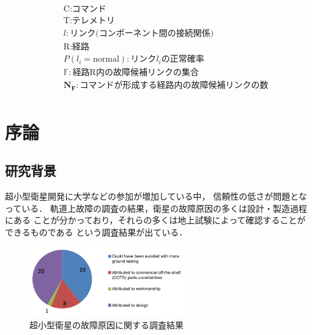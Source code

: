 \documentclass[11pt]{jsarticle}%
\begin{document}
\begin{multicols}{2}
\vspace{-12zh}
\begin{eqnarray*}
   &&\text{C} : \text{コマンド} \\
   &&\text{T} : \text{テレメトリ} \\
   &&l: \text{リンク(コンポーネント間の接続関係)}\\
   &&\text{R}: \text{経路}\\
   &&P(l_{i} = \text{normal}) : \text{リンク}l_i\text{の正常確率}\\
   &&\mathbb{F}: \text{経路R内の故障候補リンクの集合}\\
   &&\mathbf{N_F}: \text{コマンドが形成する経路内の故障候補リンクの数}\\
\end{eqnarray*}
\vspace{-6zh}
  \section{序論}
  \vspace{-1zh}
  \subsection{研究背景}
  \vspace{-1zh}
  超小型衛星開発に大学などの参加が増加している中，
  信頼性の低さが問題となっている\cite{Langer2016}．
  軌道上故障の調査の結果，衛星の故障原因の多くは設計・製造過程にある\cite{Venturini2017}
  ことが分かっており，それらの多くは地上試験によって確認することができるものである
  という調査結果が出ている\cite{SAITO2011}．
  \vspace{-1zh}
  \begin{figure}[H]
    \centering
      \includegraphics[height=3.0cm]{../figure/cause_of_failure.png}
      \caption{超小型衛星の故障原因に関する調査結果\cite{Venturini2017}}
      \label{fig:cause_of_failure}
  \end{figure}
  

\end{multicols}
\end{document}
